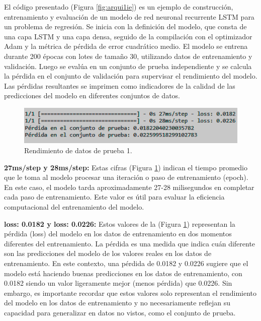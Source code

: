El código presentado (Figura \ref{fig:arqui1ie}) es un ejemplo de construcción,
entrenamiento y evaluación de un modelo de red neuronal recurrente LSTM para un
problema de regresión. Se inicia con la definición del modelo, que consta de
una capa LSTM y una capa densa, seguido de la compilación con el optimizador
Adam y la métrica de pérdida de error cuadrático medio. El modelo se entrena
durante 200 épocas con lotes de tamaño 30, utilizando datos de entrenamiento y
validación. Luego se evalúa en un conjunto de prueba independiente y se calcula
la pérdida en el conjunto de validación para supervisar el rendimiento del
modelo. Las pérdidas resultantes se imprimen como indicadores de la calidad de
las predicciones del modelo en diferentes conjuntos de datos.

\begin{figure}[H]
  \begin{center}
    \includegraphics[scale=0.80]{./res1i.png}
    \caption{Rendimiento de datos de prueba 1.}
    \label{fig:rend1}
  \end{center}
\end{figure}

\textbf{27ms/step y 28ms/step:} Estas cifras (Figura \ref{fig:rend1}) indican el tiempo promedio que le toma al modelo procesar una iteración o paso de entrenamiento (epoch). En este caso, el modelo tarda aproximadamente 27-28 milisegundos en completar cada paso de entrenamiento. Este valor es útil para evaluar la eficiencia computacional del entrenamiento del modelo.

\vspace{1\baselineskip}
\textbf{loss: 0.0182 y loss: 0.0226:} Estos valores de la (Figura \ref{fig:rend1}) representan la pérdida (loss) del modelo en los datos de entrenamiento en dos momentos diferentes del entrenamiento. La pérdida es una medida que indica cuán diferente son las predicciones del modelo de los valores reales en los datos de entrenamiento. En este contexto, una pérdida de 0.0182 y 0.0226 sugiere que el modelo está haciendo buenas predicciones en los datos de entrenamiento, con 0.0182 siendo un valor ligeramente mejor (menos pérdida) que 0.0226. Sin embargo, es importante recordar que estos valores solo representan el rendimiento del modelo en los datos de entrenamiento y no necesariamente reflejan su capacidad para generalizar en datos no vistos, como el conjunto de prueba.

